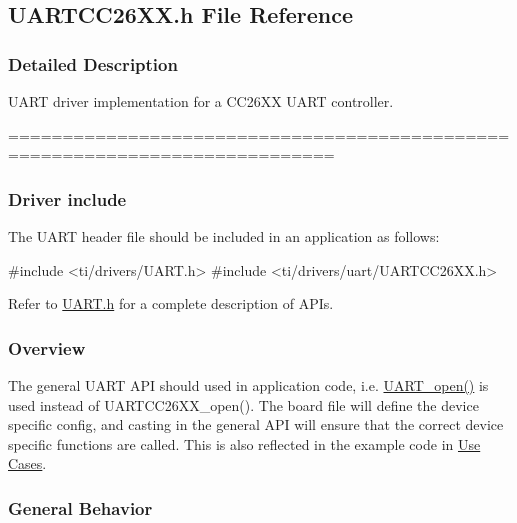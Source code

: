 \subsection{U\+A\+R\+T\+C\+C26\+X\+X.\+h File Reference}
\label{_u_a_r_t_c_c26_x_x_8h}


\subsubsection{Detailed Description}
U\+A\+R\+T driver implementation for a C\+C26\+X\+X U\+A\+R\+T controller. 

============================================================================

\subsubsection*{Driver include}

The U\+A\+R\+T header file should be included in an application as follows\+: 
\begin{DoxyCode}
\textcolor{preprocessor}{#include <ti/drivers/UART.h>}
\textcolor{preprocessor}{#include <ti/drivers/uart/UARTCC26XX.h>}
\end{DoxyCode}


Refer to \hyperlink{_u_a_r_t_8h}{U\+A\+R\+T.\+h} for a complete description of A\+P\+Is.

\subsubsection*{Overview}

The general U\+A\+R\+T A\+P\+I should used in application code, i.\+e. \hyperlink{_u_a_r_t_8h_a0442ea1ec23901168da31726bb3254c1}{U\+A\+R\+T\+\_\+open()} is used instead of U\+A\+R\+T\+C\+C26\+X\+X\+\_\+open(). The board file will define the device specific config, and casting in the general A\+P\+I will ensure that the correct device specific functions are called. This is also reflected in the example code in \hyperlink{_u_a_r_t_c_c26_x_x_8h_USE_CASES}{Use Cases}.

\subsubsection*{General Behavior}


